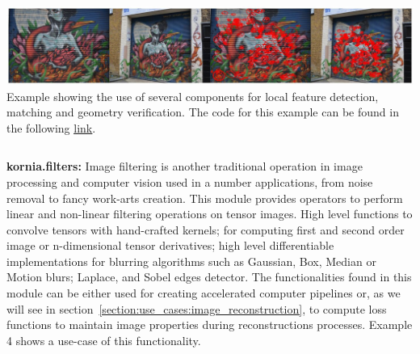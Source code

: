 \vspace{.5cm}

\begin{tcolorbox}[every float=\centering, drop shadow, title=Example 3: Feature detection and Matching]
    \label{fig:examples:feature}
    \includegraphics[width=1.\linewidth]{main/chapter03/data/examples/kornia_birdwoman.jpg}
    {Example showing the use of several components for local feature detection, matching and geometry verification. %
    The code for this example can be found in the following \underline{\color{blue}\href{https://colab.research.google.com/drive/1hl6ex1i8eNaoIZICxNqIO40PGcb8Txdo}{link}}.}
    \inputminted[python3, baselinestretch=1., style=vs, fontfamily=courier, fontsize=\footnotesize, funcnamehighlighting=true]{python}{main/chapter03/data/examples/snipet_feature.py}
\end{tcolorbox}


\noindent\textbf{kornia.filters:} Image filtering is another traditional operation  in image processing and computer vision used in a number applications, from  noise removal to fancy work-arts creation. This module provides operators to perform linear and non-linear filtering operations on tensor images. High level functions to convolve tensors with hand-crafted kernels; for computing first and second order image or n-dimensional tensor derivatives; high level differentiable implementations for blurring algorithms such as Gaussian, Box, Median or Motion blurs; Laplace, and Sobel\citep{kanopoulos1988design} edges detector. The functionalities found in this module can be either used for creating accelerated computer pipelines or, as we will see in section~\ref{section:use_cases:image_reconstruction}, to compute loss functions to maintain image properties during reconstructions processes. Example 4 shows a use-case of this functionality.

\vspace{.5cm}

